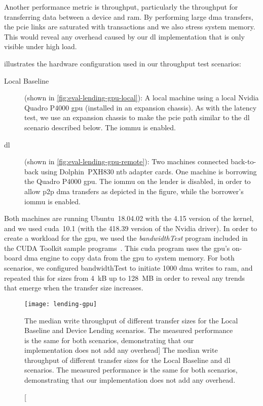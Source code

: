 Another performance metric is throughput, particularly the throughput for transferring data between a device and \gls{ram}.
%
By performing large \gls{dma} transfers, the \gls{pcie} links are saturated with transactions and we also stress system memory.
%
This would reveal any overhead caused by our \gls{dl} implementation that is only visible under high load.


 illustrates the hardware configuration used in our throughput test scenarios:
\begin{description}
    \item[Local Baseline] (shown in \cref{fig:eval-lending-gpu-local}):
        A local machine using a local Nvidia Quadro P4000 \gls{gpu} (installed in an expansion chassis).
        As with the latency test, we use an expansion chassis to make the \gls{pcie} path similar to the \gls{dl} scenario described below.
        The \gls{iommu} is enabled.

    \item[\gls{dl}] (shown in \cref{fig:eval-lending-gpu-remote}): 
        Two machines connected back-to-back using Dolphin~PXH830 \gls{ntb} adapter cards.
        One machine is borrowing the Quadro P4000 \gls{gpu}.
        The \gls{iommu} on the \gls{lender} is disabled, in order to allow \gls{p2p} \gls{dma} transfers as depicted in the figure, while the \gls{borrower}'s \gls{iommu} is enabled.
\end{description}
%
Both machines are running Ubuntu~18.04.02 with the 4.15 version of the kernel, and we used \gls{cuda}~10.1 (with the 418.39 version of the Nvidia driver).
%
In order to create a workload for the \gls{gpu}, we used the \emph{bandwidthTest} program included in the CUDA Toolkit sample programs~\cite{url:cuda}.
%
This \gls{cuda} program uses the \gls{gpu}'s on-board \gls{dma} engine to copy data from the \gls{gpu} to system memory.
%
For both scenarios, we configured bandwidthTest to initiate 1000 \gls{dma} writes to \gls{ram}, and repeated this for sizes from 4~kB up to 128~MB in order to reveal any trends that emerge when the transfer size increases.

\begin{figure}
    \centering
    \texttt{[image: lending-gpu]}
    \caption
    [The median  write throughput of different transfer sizes for the Local Baseline and Device Lending scenarios. The measured performance is the same for both scenarios, demonstrating that our implementation does not add any overhead]
    {The median  write throughput of different transfer sizes for the Local Baseline and \gls{dl} scenarios. The measured performance is the same for both scenarios, demonstrating that our implementation does not add any overhead.}
    \label{fig:eval-lending-gpu-results}
\end{figure}


